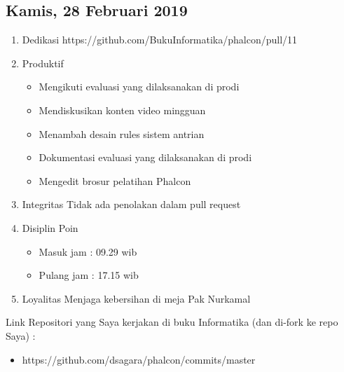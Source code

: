 \subsection{Kamis, 28 Februari 2019}
\begin{enumerate}
\item Dedikasi
\subitem https://github.com/BukuInformatika/phalcon/pull/11

\item Produktif
\begin{itemize}
\item Mengikuti evaluasi yang dilaksanakan di prodi
\item Mendiskusikan konten video mingguan
\item Menambah desain rules sistem antrian
\item Dokumentasi evaluasi yang dilaksanakan di prodi
\item Mengedit brosur pelatihan Phalcon
\end{itemize}

\item Integritas
\subitem Tidak ada penolakan dalam pull request

\item Disiplin
\subitem Poin
\begin{itemize}
\item Masuk jam : 09.29 wib
\item Pulang jam : 17.15 wib
\end{itemize}

\item Loyalitas
\subitem Menjaga kebersihan di meja Pak Nurkamal
\end{enumerate}

Link Repositori yang Saya kerjakan di buku Informatika (dan di-fork ke repo Saya) :
\begin{itemize}
\item https://github.com/dsagara/phalcon/commits/master
\end{itemize} 